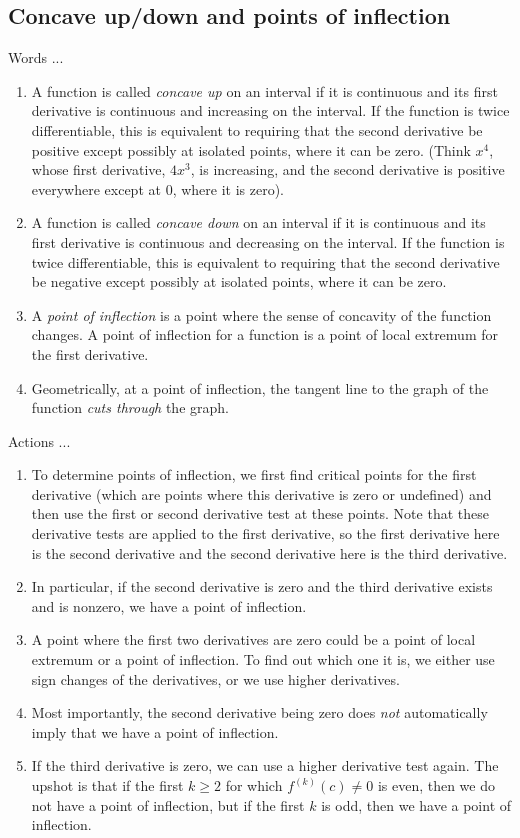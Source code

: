 \documentclass[10pt]{amsart}
\begin{document}
\subsection{Concave up/down and points of inflection}

Words ...

\begin{enumerate}
\item A function is called {\em concave up} on an interval if it is
  continuous and its first derivative is continuous and increasing on
  the interval. If the function is twice differentiable, this is
  equivalent to requiring that the second derivative be positive
  except possibly at isolated points, where it can be zero. (Think
  $x^4$, whose first derivative, $4x^3$, is increasing, and the second
  derivative is positive everywhere except at $0$, where it is zero).
\item A function is called {\em concave down} on an interval if it is
  continuous and its first derivative is continuous and decreasing on
  the interval. If the function is twice differentiable, this is
  equivalent to requiring that the second derivative be negative
  except possibly at isolated points, where it can be zero.
\item A {\em point of inflection} is a point where the sense of
  concavity of the function changes. A point of inflection for a
  function is a point of local extremum for the first derivative.
\item Geometrically, at a point of inflection, the tangent line to the
  graph of the function {\em cuts through} the graph.
\end{enumerate}

Actions ...

\begin{enumerate}

\item To determine points of inflection, we first find critical points
  for the first derivative (which are points where this derivative is
  zero or undefined) and then use the first or second derivative test
  at these points. Note that these derivative tests are applied to
  the first derivative, so the first derivative here is the second
  derivative and the second derivative here is the third derivative.
\item In particular, if the second derivative is zero and the third
  derivative exists and is nonzero, we have a point of inflection.
\item A point where the first two derivatives are zero could be a
  point of local extremum or a point of inflection. To find out which
  one it is, we either use sign changes of the derivatives, or we use
  higher derivatives.
\item Most importantly, the second derivative being zero does {\em
  not} automatically imply that we have a point of inflection.
\item If the third derivative is zero, we can use a higher derivative
  test again. The upshot is that if the first $k \ge 2$ for which
  $f^{(k)}(c) \ne 0$ is even, then we do not have a point of
  inflection, but if the first $k$ is odd, then we have a point of
  inflection.
\end{enumerate}
\end{document}
